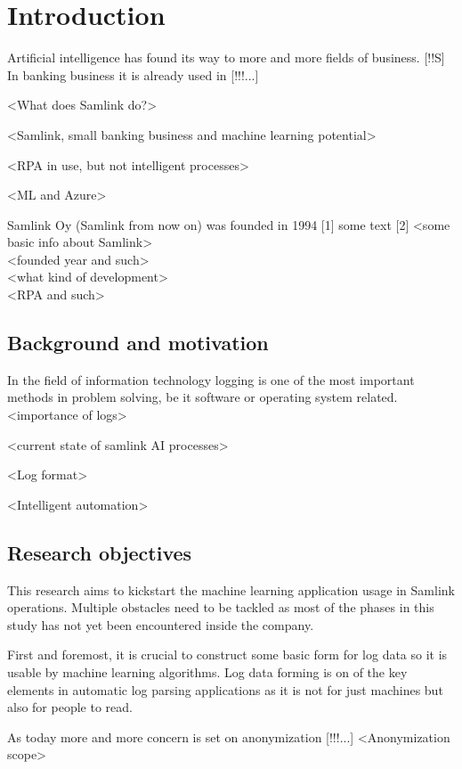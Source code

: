 \documentclass[english, 12pt, a4paper, elec, utf8, a-1b, online]{aaltothesis}
\begin{document}
\section{Introduction}

\thispagestyle{empty}

Artificial intelligence has found its way to more and more fields of business. [!!S]
In banking business it is already used in [!!!...]


<What does Samlink do?>

<Samlink, small banking business and machine learning potential>

<RPA in use, but not intelligent processes>

<ML and Azure>

Samlink Oy (Samlink from now on) was founded in 1994 [1]
some text [2]
<some basic info about Samlink> \\
<founded year and such> \\
<what kind of development> \\
<RPA and such> \\


\subsection{Background and motivation}
In the field of information technology
logging is one of the most important methods
in problem solving,
be it software or operating system related. \cite{delarosa2018log}
<importance of logs>

<current state of samlink AI processes>

<Log format>

<Intelligent automation>

\subsection{Research objectives}
This research aims to kickstart the machine learning application usage in Samlink operations.
Multiple obstacles need to be tackled
as most of the phases in this study has not yet been encountered inside the company.

First and foremost,
it is crucial to construct some basic form for log data
so it is usable by machine learning algorithms.
Log data forming is on of the key elements in automatic log parsing applications
as it is not for just machines
but also for people to read.

As today more and more concern is set on anonymization
[!!!...]
<Anonymization scope>
\end{document}
